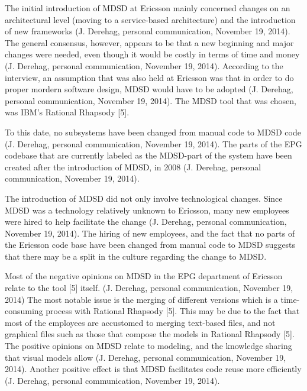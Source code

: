 \documentclass[final_report_innit.tex]{subfiles}
\begin{document}
The initial introduction of MDSD at Ericsson mainly concerned changes on an architectural level (moving to a service-based architecture) and the introduction of new frameworks (J. Derehag, personal communication, November 19, 2014). The general consensus, however, appears to be that a new beginning and major changes were needed, even though it would be costly in terms of time and money (J. Derehag, personal communication, November 19, 2014). According to the interview, an assumption that was also held at Ericsson was that in order to do proper mordern software design, MDSD would have to be adopted (J. Derehag, personal communication, November 19, 2014). The MDSD tool that was chosen, was IBM’s Rational Rhapsody [5].

To this date, no subsystems have been changed from manual code to MDSD code (J. Derehag, personal communication, November 19, 2014). The parts of the EPG codebase that are currently labeled as the MDSD-part of the system have been created after the introduction of MDSD, in 2008 (J. Derehag, personal communication, November 19, 2014). 

The introduction of MDSD did not only involve technological changes. Since MDSD was a technology relatively unknown to Ericsson, many new employees were hired to help facilitate the change (J. Derehag, personal communication, November 19, 2014). The hiring of new employees, and the fact that no parts of the Ericsson code base have been changed from manual code to MDSD suggests that there may be a split in the culture regarding the change to MDSD. 

Most of the negative opinions on MDSD in the EPG department of Ericsson relate to the tool [5] itself. (J. Derehag, personal communication, November 19, 2014) The most notable issue is the merging of different versions which is a time-consuming process with Rational Rhapsody [5]. This may be due to the fact that most of the employees are accustomed to merging text-based files, and not graphical files such as those that compose the models in Rational Rhapsody [5]. The positive opinions on MDSD relate to modeling, and the knowledge sharing that visual models allow (J. Derehag, personal communication, November 19, 2014). Another positive effect is that MDSD facilitates code reuse more efficiently (J. Derehag, personal communication, November 19, 2014). 
\end{document}
